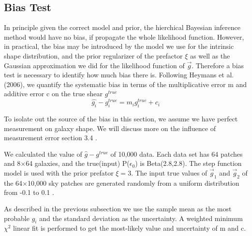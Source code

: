\documentclass[useAMS,usenatbib]{mn2e}
\begin{document}
\subsection{Bias Test}
In principle given the correct model and prior,
the hierchical Bayesian inference method would have no bias, if propagate the whole likelihood function.
However, in practical, the bias may be introduced by the model we use for the intrinsic shape distribution,
and the prior regularizer of the prefactor $\xi$ as well as the Gaussian approximation we did for the likelihood
function of $\vec{g}$. Therefore a bias test is necessary to identify how much bias there is. 
Following Heymans et al. (2006), we quantify the systematic bias 
in terms of the multiplicative error m and additive error c on the
true shear $g^{true}$ 
\begin{equation}
\hat{g_{i}}-g_{i}^{true}=m_{i}g_{i}^{true}+c_{i}
\end{equation}

To isolate out the source of the bias in this section, we assume we have perfect measurement on galaxy shape.
We will discuss more on the influence of measurement error section 3.4 .

We calculated the value of $\hat{g}-g^{true}$ of 10,000 data. Each data set has 64 patches and 8$\times$64 galaxies, and
the true(input) P($\epsilon_{0}$) is Beta(2.8,2.8). The step function model is used with the prior prefator $\xi=3$.
The input true values of $\vec{g}_{1}$ and $\vec{g}_{2}$ of the 64$\times$10,000 sky patches are generated randomly from a uniform distribution from -0.1 to 0.1 . 

As described in the previous subsection we use the sample mean as the most probable $g_{i}$ and 
the standard deviation as the uncertainty. A weighted minimum $\chi^{2}$ linear fit is performed to get the
most-likely value and uncertainty of m and c.
 
\end{document}
